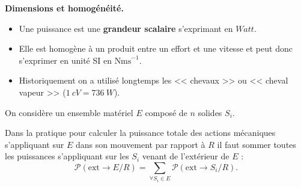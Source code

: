 \documentclass[10pt,fleqn]{article} %
\begin{document}
\begin{warn}\textbf{Dimensions et homogénéité.}
\begin{itemize}
\item Une puissance est une \textbf{grandeur scalaire} s'exprimant en $Watt$.
\item Elle est homogène à un produit entre un effort et une vitesse et peut donc s'exprimer en unité SI en $\text{Nms}^{-1}$.
\item Historiquement on a utilisé longtemps les << chevaux >> ou << cheval vapeur >> ($\SI{1}{cV}= \SI{736}{W}$).
\end{itemize}

\end{warn}

\begin{prop}
On considère un ensemble matériel $E$ composé de $n$ solides $S_i$. 

Dans la pratique pour calculer la puissance totale des actions mécaniques s'appliquant sur $E$ dans son mouvement par rapport à $R$ il faut sommer toutes les puissances s'appliquant sur les $S_i$ venant de l'extérieur de $E$ :
$$
\mathcal{P}(\text{ext} \rightarrow E/R)=\displaystyle{\sum_{\forall S_i \in E}\mathcal{P}(\text{ext} \rightarrow S_i/R)}.
$$
\end{prop}

%
%
%
\end{document}
